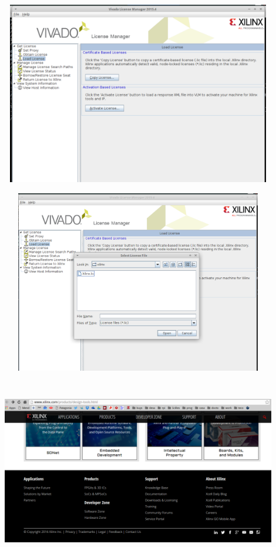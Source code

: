\documentclass[a4paper,11pt]{article}
\begin{document}
    \begin{center}
    \includegraphics[height=8cm,width=12cm]{vivado_installer_11}
    \end{center}

    \begin{center}
    \includegraphics[height=8cm,width=12cm]{vivado_installer_12}
    \end{center}

    \begin{center}
    \includegraphics[height=8cm,width=12cm]{vivado_installer_13}
    \end{center}
\end{document}
